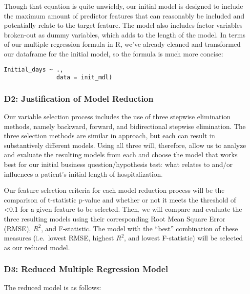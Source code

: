 \documentclass[
]{article}
\begin{document}
Though that equation is quite unwieldy, our initial model is designed to
include the maximum amount of predictor features that can reasonably be
included and potentially relate to the target feature. The model also
includes factor variables broken-out as dummy variables, which adds to
the length of the model. In terms of our multiple regression formula in
\(\mbox{R}\), we've already cleaned and transformed our dataframe for
the initial model, so the formula is much more concise:

\begin{verbatim}
Initial_days ~ .,
               data = init_mdl)
\end{verbatim}

\hypertarget{d2-justification-of-model-reduction}{%
\subsubsection{D2: Justification of Model
Reduction}\label{d2-justification-of-model-reduction}}

Our variable selection process includes the use of three stepwise
elimination methods, namely backward, forward, and bidirectional
stepwise elimination. The three selection methods are similar in
approach, but each can result in substantively different models. Using
all three will, therefore, allow us to analyze and evaluate the
resulting models from each and choose the model that works best for our
initial business question/hypothesis test: what relates to and/or
influences a patient's initial length of hospitalization.

Our feature selection criteria for each model reduction process will be
the comparison of t-statistic p-value and whether or not it meets the
threshold of \textless0.1 for a given feature to be selected. Then, we
will compare and evaluate the three resulting models using their
corresponding Root Mean Square Error (RMSE), \(R^2\), and F-statistic.
The model with the ``best'' combination of these measures (i.e.~lowest
RMSE, highest \(R^2\), and lowest F-statistic) will be selected as our
reduced model.

\hypertarget{d3-reduced-multiple-regression-model}{%
\subsubsection{D3: Reduced Multiple Regression
Model}\label{d3-reduced-multiple-regression-model}}

The reduced model is as follows:
\end{document}
